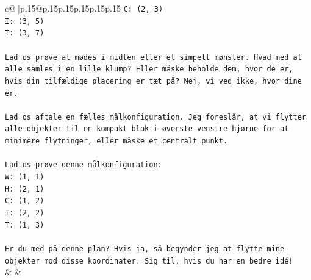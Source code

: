 \documentclass{article}
\begin{document}
{\begin{supertabular}{c@{$\;$}|p{.15\linewidth}@{}p{.15\linewidth}p{.15\linewidth}p{.15\linewidth}p{.15\linewidth}p{.15\linewidth}}
{{{\texttt{C: (2, 3)} \\
\texttt{I: (3, 5)} \\
\texttt{T: (3, 7)} \\
\\ 
\texttt{Lad os prøve at mødes i midten eller et simpelt mønster. Hvad med at alle samles i en lille klump? Eller måske beholde dem, hvor de er, hvis din tilfældige placering er tæt på? Nej, vi ved ikke, hvor dine er.} \\
\\ 
\texttt{Lad os aftale en fælles målkonfiguration. Jeg foreslår, at vi flytter alle objekter til en kompakt blok i øverste venstre hjørne for at minimere flytninger, eller måske et centralt punkt.} \\
\\ 
\texttt{Lad os prøve denne målkonfiguration:} \\
\texttt{W: (1, 1)} \\
\texttt{H: (2, 1)} \\
\texttt{C: (1, 2)} \\
\texttt{I: (2, 2)} \\
\texttt{T: (1, 3)} \\
\\ 
\texttt{Er du med på denne plan? Hvis ja, så begynder jeg at flytte mine objekter mod disse koordinater. Sig til, hvis du har en bedre idé!} \\
            }
        }
    }
    & & \\ \\


\end{supertabular}}
\end{document}
